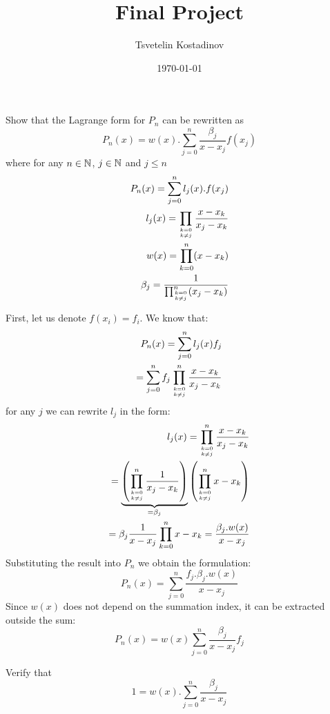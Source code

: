 \documentclass[a4paper, oneside]{article}
\title{Final Project}
\date{\today}
\author{Tsvetelin Kostadinov}
\begin{document}


\begin{problem}\label{ex:1}
Show that the Lagrange form for $P_n$ can be rewritten as
\begin{equation}
    P_n(x) = w(x).\sum_{j=0}^n \frac{\beta_j}{x - x_j}f(x_j)
\end{equation}
where for any $n \in {\mathbb{N}}$, $j \in {\mathbb{N}}$ and $j \leq n$
\begin{align}
    P_n(x) = \sum_{j=0}^n l_j(x).f(x_j)                         \\
    l_j(x) = \prod_{k=0 \atop k \neq j} \frac{x-x_k}{x_j - x_k} \\
    w(x) = \prod_{k=0}^n (x - x_k)                              \\
    \beta_j = \frac{1}{\prod_{k=0 \atop k\neq j}^n (x_j - x_k)}
\end{align}
\end{problem}
\begin{solution}
    First, let us denote $f(x_i) = f_i$. We know that:
    \begin{align}
        P_n(x) = \sum_{j=0}^n l_j(x)f_j \\
        = \sum_{j=0}^n f_j \prod_{k=0 \atop k \neq j}^n \frac{x-x_k}{x_j - x_k}
    \end{align}
    for any $j$ we can rewrite $l_j$ in the form:
    \begin{align}
        l_j(x) = \prod_{k=0 \atop k \neq j}^n \frac{x-x_k}{x_j - x_k}                                                                              \\
        = \underbrace{\left( \prod_{k=0 \atop k \neq j}^n \frac{1}{x_j - x_k}\right)}_{=\beta_j} \left(\prod_{k=0 \atop k \neq j}^n x - x_k\right) \\
        = \beta_j \frac{1}{x - x_j} \prod_{k=0}^n x - x_k= \frac{\beta_j.w(x)}{x - x_j}
    \end{align}
    Substituting the result into $P_n$ we obtain the formulation:
    \begin{equation}
        P_n(x) = \sum_{j=0}^n \frac{f_j.\beta_j.w(x)}{x-x_j}
    \end{equation}
    Since $w(x)$ does not depend on the summation index, it can be extracted outside the sum:
    \begin{equation}
        P_n(x) = w(x) \sum_{j=0}^n \frac{\beta_j}{x-x_j}f_j
    \end{equation}
\end{solution}
\begin{problem}
Verify that
\begin{equation}
    1 = w(x).\sum_{j=0}^n \frac{\beta_j}{x - x_j}
\end{equation}
\end{problem}
\end{document}
